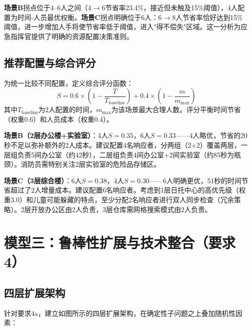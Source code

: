 \documentclass[12pt,a4paper]{ctexart}
\begin{document}
\textbf{场景B}拐点位于4--6人之间（4$\to$6节省率23.4\%，接近但未触及15\%阈值），4人配置为时间-人员最优权衡。\textbf{场景C}拐点明确位于6人：6$\to$8人节省率恰好达到15\%阈值，进一步增加人手将使节省率低于阈值，进入"得不偿失"区域。这一分析为应急指挥官提供了明确的资源配置决策准则。

\subsection{推荐配置与综合评分}

为统一比较不同配置，定义综合评分函数：
\begin{equation}
S = 0.6 \times \left(1 - \frac{T}{T_{\text{baseline}}}\right) + 0.4 \times \left(1 - \frac{m}{m_{\max}}\right)
\end{equation}
其中$T_{\text{baseline}}$为2人配置的时间，$m_{\max}$为该场景最大合理人数。评分平衡时间节省（权重0.6）和人员成本（权重0.4）。

\textbf{场景B（2层办公楼+实验室）}：4人$S=0.35$，6人$S=0.33$——4人略优，节省的20秒不足以弥补额外的2人成本。建议配置4名响应者，分两组（2+2）覆盖两层，一层组负责5间办公室（约42秒），二层组负责4间办公室+2间实验室（约85秒为瓶颈）。消防员需特别关注2层实验室的危险品存储区。

\textbf{场景C（3层综合楼）}：6人$S=0.38$，4人$S=0.30$——6人明确更优，51秒的时间节省超过了2人增量成本。建议配置6名响应者。考虑到1层日托中心的高优先级（权重3.0）和儿童可能躲藏的特点，至少分配2名响应者进行双人同步检查（冗余策略）。2层开放办公区由2人负责，3层仓库需网格搜索模式由2人负责。

\section{模型三：鲁棒性扩展与技术整合（要求4）}

\subsection{四层扩展架构}

针对要求4a，建立如图所示的四层扩展架构，在确定性子问题之上叠加随机性因素：
\end{document}
